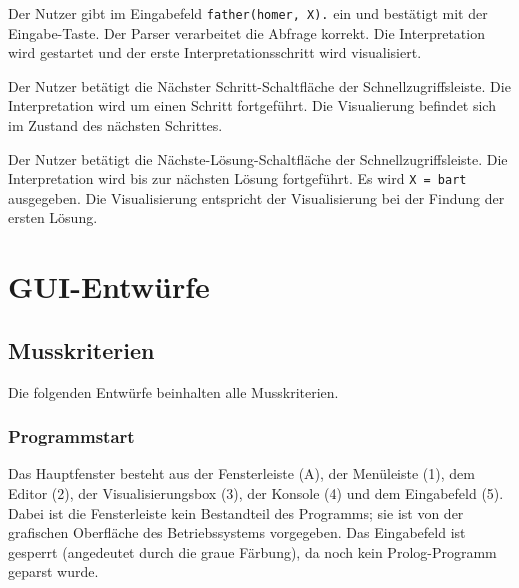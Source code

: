 \documentclass[parskip=full,11pt,twoside]{scrartcl}
\begin{document}
{Der Nutzer gibt im Eingabefeld \texttt{father(homer, X).} ein und bestätigt mit der Eingabe-Taste.}
{Der Parser verarbeitet die Abfrage korrekt. Die Interpretation wird gestartet und der erste Interpretationsschritt wird visualisiert.}

{Der Nutzer betätigt die Nächster Schritt-Schaltfläche der Schnellzugriffsleiste.}
{Die Interpretation wird um einen Schritt fortgeführt. Die Visualierung befindet sich im Zustand des nächsten Schrittes.}

{Der Nutzer betätigt die Nächste-Lösung-Schaltfläche der Schnellzugriffsleiste.}
{Die Interpretation wird bis zur nächsten Lösung fortgeführt. Es wird \texttt{X = bart} ausgegeben. Die Visualisierung entspricht der Visualisierung bei der Findung der ersten Lösung.}

\appendix

\section{GUI-Entwürfe}

\subsection{Musskriterien}

Die folgenden Entwürfe beinhalten alle Musskriterien.

\subsubsection{Programmstart}

\begin{minipage}{\linewidth}
\end{minipage}

Das Hauptfenster besteht aus der Fensterleiste (A), der Menüleiste (1), dem Editor (2), der Visualisierungsbox (3), der Konsole (4) und dem Eingabefeld (5).
Dabei ist die Fensterleiste kein Bestandteil des Programms; sie ist von der grafischen Oberfläche des Betriebssystems vorgegeben.
Das Eingabefeld ist gesperrt (angedeutet durch die graue Färbung), da noch kein Prolog-Programm geparst wurde.
\end{document}
